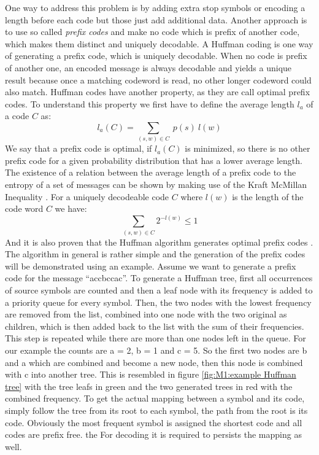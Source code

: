 \par{
One way to address this problem is by adding extra stop symbols or encoding a length before each code but those just add additional data. Another approach is to use so called \emph{prefix codes} and make no code which is prefix of another code, which makes them distinct and uniquely decodable. A Huffman coding is one way of generating a prefix code, which is uniquely decodable. When no code is prefix of another one, an encoded message is always decodable and yields a unique result because once a matching codeword is read, no other longer codeword could also match. Huffman codes have another property, as they are call optimal prefix codes. To understand this property we first have to define the average length $l_a$ of a code $C$ as:
\[
l_a(C) = \sum_{(s,w)\in C} \: p(s) \: l(w)
\]
We say that a prefix code is optimal, if $l_a(C)$ is minimized, so there is no other prefix code for a given probability distribution that has a lower average length. The existence of a relation between the average length of a prefix code to the entropy of a set of messages can be shown by making use of the Kraft McMillan Inequality \cite{mcKillan}. For a uniquely decodeable code $C$ where $l(w)$ is the length of the code word $C$ we have:
\[
\sum_{(s,w)\in C} 2^{-l(w)} \leq 1
\]
And it is also proven that the Huffman algorithm generates optimal prefix codes \cite{compressionIntroduction}. The algorithm	 in general is rather simple and the generation of the prefix codes will be demonstrated using an example. Assume we want to generate a prefix code for the message \enquote{accbccac}. To generate a Huffman tree, first all occurrences of source symbols are counted and then a leaf node with its frequency is added to a priority queue for every symbol. Then, the two nodes with the lowest frequency are removed from the list, combined into one node with the two original as children, which is then added back to the list with the sum of their frequencies. This step is repeated while there are more than one nodes left in the queue. For our example the counts are a = 2, b = 1 and c = 5. So the first two nodes are b and a which are combined and become a new node, then this node is combined with c into another tree. This is resembled in figure \ref{fig:M1:example Huffman tree} with the tree leafs in green and the two generated trees in red with the combined frequency. To get the actual mapping between a symbol and its code, simply follow the tree from its root to each symbol, the path from the root is its code. Obviously the most frequent symbol is assigned the shortest code and all codes are prefix free. the For decoding it is required to persists the mapping as well.

}
